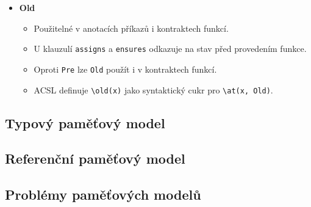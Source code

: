 \begin{itemize}
    \item \textbf{Old}
    \begin{itemize}
        \item Použitelné v anotacích příkazů i kontraktech funkcí.
        \item U klauzulí \texttt{assigns} a \texttt{ensures} odkazuje na stav před provedením funkce.
        \item Oproti \texttt{Pre} lze \texttt{Old} použít i v kontraktech funkcí.
        \item ACSL definuje \texttt{\textbackslash old(x)} jako syntaktický cukr pro \texttt{\textbackslash at(x, Old)}.
    \end{itemize}
\end{itemize}

\subsection{Typový paměťový model}

\subsection{Referenční paměťový model}

\subsection{Problémy paměťových modelů}
